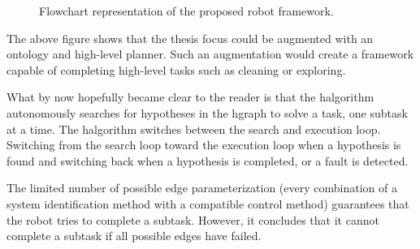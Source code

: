 \begin{figure}[H]
\caption{Flowchart representation of the proposed robot framework.}%
\label{tikz:flowchart_proposed_method}
\end{figure}

The above figure shows that the thesis focus could be augmented with an ontology and high-level planner. Such an augmentation would create a framework capable of completing high-level tasks such as cleaning or exploring.\bs





What by now hopefully became clear to the reader is that the \ac{halgorithm} autonomously searches for hypotheses in the \ac{hgraph} to solve a task, one subtask at a time. The \ac{halgorithm} switches between the search and execution loop. Switching from the search loop toward the execution loop when a hypothesis is found and switching back when a hypothesis is completed, or a fault is detected.\bs

The limited number of possible edge parameterization (every combination of a system identification method with a compatible control method) guarantees that the robot tries to complete a subtask. However, it concludes that it cannot complete a subtask if all possible edges have failed.\bs

